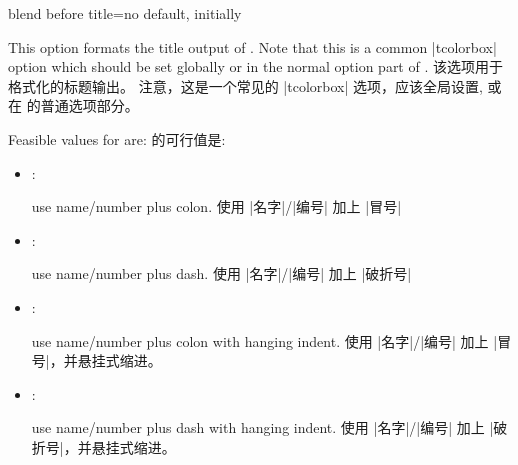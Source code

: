 \begin{docTcbKey}[][doc new=2015-03-13]{blend before title}{=}{no default, initially }
\begin{stripedbox}
This option formats the title output of .
Note that this is a common |tcolorbox| option which should be set
globally or in the normal option part of .
\tcblower
该选项用于格式化的标题输出。%
注意，这是一个常见的 |tcolorbox| 选项，应该全局设置, 或在  的普通选项部分。\end{stripedbox}

\begin{stripedbox}
Feasible values for  are:
\tcblower
{}的可行值是:
\end{stripedbox}
\begin{itemize}
\item{}: 
\begin{stripedbox}
use name/number plus colon.
\tcblower
使用 |名字|/|编号| 加上 |冒号|
\end{stripedbox}

\item{}: 
\begin{stripedbox}
use name/number plus dash.
\tcblower
使用 |名字|/|编号| 加上 |破折号|
\end{stripedbox}

\item{}: 
\begin{stripedbox}
use name/number plus colon with hanging indent.
\tcblower
使用 |名字|/|编号| 加上 |冒号|，并悬挂式缩进。
\end{stripedbox}

\item{}: 
\begin{stripedbox}
use name/number plus dash with hanging indent.
\tcblower
使用 |名字|/|编号| 加上 |破折号|，并悬挂式缩进。
\end{stripedbox}
\end{itemize}

{\tcbusetemp}
\end{docTcbKey}

